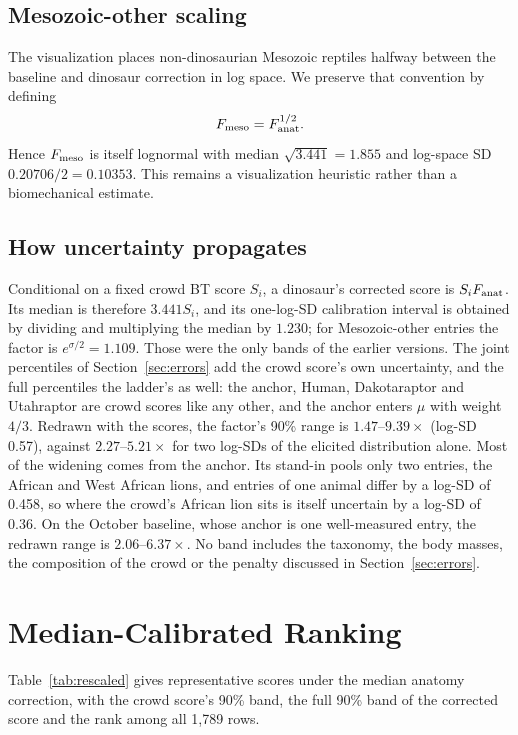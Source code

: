 \documentclass[11pt]{article}
\begin{document}
\subsection{Mesozoic-other scaling}
The visualization places non-dinosaurian Mesozoic reptiles halfway between the baseline and dinosaur correction in log space. We preserve that convention by defining
\[
F_{\rm meso}=F_{\rm anat}^{1/2}.
\]
Hence $F_{\rm meso}$ is itself lognormal with median $\sqrt{3.441}=1.855$ and log-space SD $0.20706/2=0.10353$. This remains a visualization heuristic rather than a biomechanical estimate.

\subsection{How uncertainty propagates}
Conditional on a fixed crowd BT score $S_i$, a dinosaur's corrected score is $S_iF_{\rm anat}$. Its median is therefore $3.441S_i$, and its one-log-SD calibration interval is obtained by dividing and multiplying the median by $1.230$; for Mesozoic-other entries the factor is $e^{\sigma/2}=1.109$. Those were the only bands of the earlier versions. The joint percentiles of Section~\ref{sec:errors} add the crowd score's own uncertainty, and the full percentiles the ladder's as well: the anchor, Human, Dakotaraptor and Utahraptor are crowd scores like any other, and the anchor enters $\mu$ with weight $4/3$. Redrawn with the scores, the factor's 90\% range is $1.47$--$9.39\times$ (log-SD 0.57), against $2.27$--$5.21\times$ for two log-SDs of the elicited distribution alone. Most of the widening comes from the anchor. Its stand-in pools only two entries, the African and West African lions, and entries of one animal differ by a log-SD of 0.458, so where the crowd's African lion sits is itself uncertain by a log-SD of 0.36. On the October baseline, whose anchor is one well-measured entry, the redrawn range is $2.06$--$6.37\times$. No band includes the taxonomy, the body masses, the composition of the crowd or the penalty discussed in Section~\ref{sec:errors}.

\section{Median-Calibrated Ranking}
\label{sec:results}

Table~\ref{tab:rescaled} gives representative scores under the median anatomy correction, with the crowd score's 90\% band, the full 90\% band of the corrected score and the rank among all 1,789 rows.
\end{document}
